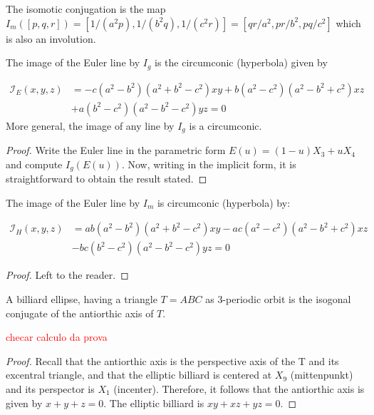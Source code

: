 	The isomotic conjugation is the map $I_m([p,q,r])=[1/(a^2p),1/(b^2 q),1/(c^2r)]=[  q r/a^2, p r/b^2, p q/c^2]$ which is also an involution.

	\begin{proposition} The image of the Euler line by $I_g$ is the circumconic (hyperbola) given by
	
	\begin{align*}
\mathcal{I}_E(x,y,z)&=-c \left( a^2-b^2 \right)   \left( {a}^{2}+{b}^{2}-{c}^
{2} \right) x y+b \left( a^2-c^2 \right)    \left( {a}^{2
}-{b}^{2}+{c}^{2} \right) x z\\
&+a \left( b^2-c^2 \right)  
 \left( {a}^{2}-{b}^{2}-{c}^{2} \right) y z  =0
	\end{align*}
	More general, the image of any line by $I_g$ is a  circumconic.
	\end{proposition}
	
	\begin{proof} Write the Euler line in the parametric form $E(u)=(1-u)X_3+uX_4$ and compute $I_g(E(u))$. Now, writing in the implicit form, it is straightforward to obtain the result stated.
	\end{proof}
	
		\begin{proposition} The image of the Euler line by $I_m$ is circumconic (hyperbola)  by:
	
	\begin{align*}
\mathcal{I}_H(x,y,z)&= a b (a^2 - b^2) (a^2 + b^2 - c^2) x y - a c (a^2 - c^2) (a^2 - b^2 + c^2) x z \\
&- b c (b^2 - c^2) (a^2 - b^2 - c^2)y z=0
	\end{align*}
	
	\end{proposition}
	
	\begin{proof}
	Left to the reader.
	\end{proof}
	
	\begin{proposition} A billiard ellipse, having a triangle $T=ABC$ as 3-periodic orbit is the isogonal conjugate of the antiorthic axis of $T$.
 \label{prop:appA-billiard-antiorthic}
	\end{proposition}
	\textcolor{red}{checar calculo da prova}
	\begin{proof}
	Recall that the antiorthic axis  is the perspective axis of the T and its excentral triangle, and that the elliptic billiard is centered at $X_9$ (mittenpunkt) and its perspector is   $X_1$ (incenter).
	Therefore, it follows that the antiorthic axis is given by $x+y+z=0$.
The elliptic billiard is $xy+xz+yz=0$.
	\end{proof}
